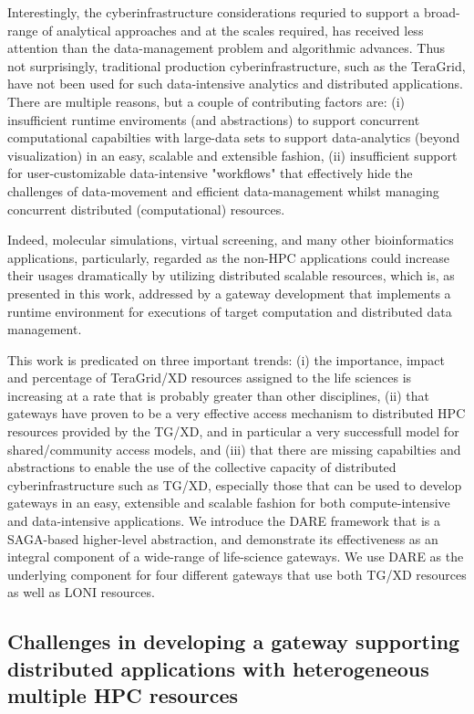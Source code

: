 \documentclass{sig-alternate}
\begin{document}
Interestingly, the cyberinfrastructure considerations requried to
support a broad-range of analytical approaches and at the scales
required, has received less attention than the data-management problem
and algorithmic advances.  Thus not surprisingly, traditional
production cyberinfrastructure, such as the TeraGrid, have not been
used for such data-intensive analytics and distributed applications. There are multiple reasons,
but a couple of contributing factors are: (i) insufficient runtime
enviroments (and abstractions) to support concurrent computational
capabilties with large-data sets to support data-analytics (beyond
visualization) in an easy, scalable and extensible fashion, (ii)
insufficient support for user-customizable data-intensive "workflows"
that effectively hide the challenges of data-movement and efficient
data-management whilst managing concurrent distributed (computational)
resources.

Indeed, molecular simulations, virtual screening, and many other bioinformatics applications, particularly, regarded as the non-HPC applications could increase their usages dramatically by utilizing distributed scalable resources, which is, as presented in this work, addressed by a gateway development that implements a runtime environment for executions of target computation and distributed data management.

This work is predicated on three important trends: (i) the importance,
impact and percentage of TeraGrid/XD resources assigned to the
life sciences is increasing at a rate that is probably greater than
other disciplines, (ii) that gateways have proven to be a very
effective access mechanism to distributed HPC resources provided by
the TG/XD, and in particular a very successfull model for
shared/community access models, and (iii) that there are missing
capabilties and abstractions to enable the use of the collective
capacity of distributed cyberinfrastructure such as TG/XD, especially
those that can be used to develop gateways in an easy, extensible and
scalable fashion for both compute-intensive and data-intensive
applications. We introduce the DARE framework that is a SAGA-based
higher-level abstraction, and demonstrate its effectiveness as an
integral component of a wide-range of life-science gateways. We
use DARE as the underlying component for four different
gateways that use both TG/XD resources as well as LONI resources.


\subsection{Challenges in developing a gateway supporting distributed applications with heterogeneous multiple HPC resources}
\end{document}
